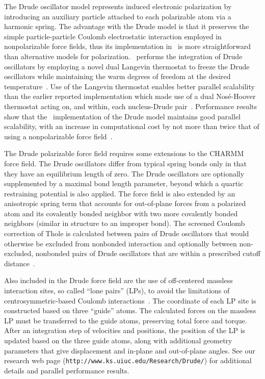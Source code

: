 The Drude oscillator model represents induced electronic polarization 
by introducing an auxiliary particle attached to each polarizable 
atom via a harmonic spring.  The advantage with the Drude model is 
that it preserves the simple particle-particle Coulomb electrostatic 
interaction employed in nonpolarizable force fields, 
thus its implementation in \NAMD\ is more straightforward than 
alternative models for polarization.  
\NAMD\ performs the integration of Drude oscillators 
by employing a novel dual Langevin thermostat to freeze the Drude 
oscillators while maintaining the warm degrees of freedom 
at the desired temperature~\cite{JIAN2011}.  
Use of the Langevin thermostat enables better parallel scalability 
than the earlier reported implementation which made use of 
a dual Nos\'e-Hoover thermostat acting on, and within,
each nucleus-Drude pair~\cite{Lamoureux-2003a}.  
Performance results 
show that the \NAMD\ implementation of the Drude model maintains good 
parallel scalability, 
with an increase in computational cost by not more than twice 
that of using a nonpolarizable force field~\cite{JIAN2011}.  

The Drude polarizable force field requires some extensions to the
CHARMM force field.  
The Drude oscillators differ from typical spring bonds only in that they 
have an equilibrium length of zero.  
The Drude oscillators are optionally supplemented by a maximal 
bond length parameter, beyond which a quartic restraining potential 
is also applied.  
The force field is also extended by an anisotropic spring term 
that accounts for out-of-plane forces from a polarized atom and its 
covalently bonded neighbor with two more covalently bonded 
neighbors (similar in structure to an improper bond).  
The screened Coulomb correction of Thole is calculated between 
pairs of Drude oscillators that would otherwise be excluded from 
nonbonded interaction and 
optionally between non-excluded, nonbonded pairs of Drude oscillators 
that are within a prescribed cutoff distance~\cite{Thole81,van1998molecular}.  

Also included in the Drude force field 
are the use of off-centered massless interaction sites, 
so called ``lone pairs'' (LPs),
to avoid the limitations 
of centrosymmetric-based Coulomb interactions~\cite{Harder2006}.  
The coordinate of each LP site is constructed based on three ``guide'' atoms.
The calculated forces on the massless LP must be transferred 
to the guide atoms, 
preserving total force and torque.  
After an integration step of velocities and positions, 
the position of the LP is updated based on the three guide atoms, 
along with additional geometry parameters that give displacement 
and in-plane and out-of-plane angles.  
See our research web page
({\tt http://www.ks.uiuc.edu/Research/Drude/})
for additional details and parallel performance results.  


